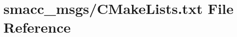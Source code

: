 \hypertarget{msgs_2CMakeLists_8txt}{}\section{smacc\+\_\+msgs/\+C\+Make\+Lists.txt File Reference}
\label{msgs_2CMakeLists_8txt}

